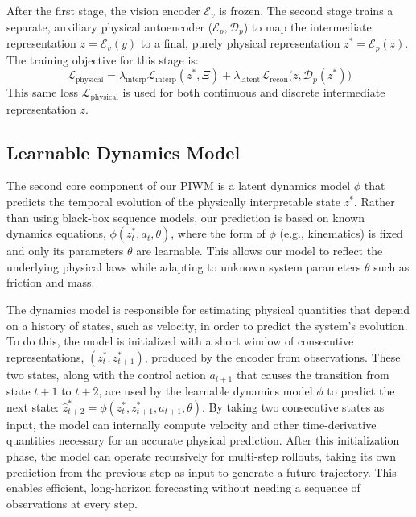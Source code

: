 \documentclass[sigconf]{acmart}
\begin{document}
After the first stage, the vision encoder \(\mathcal{E}_v\) is frozen. The second stage trains a separate, auxiliary {physical autoencoder} (\(\mathcal{E}_p, \mathcal{D}_p\)) to map the intermediate representation \(z = \mathcal{E}_v(y)\) to a final, purely physical representation \(z^* = \mathcal{E}_p(z)\). The training objective for this stage is:
\begin{equation}
    \mathcal{L}_{\text{physical}} = \lambda_{\text{interp}}\mathcal{L}_{\text{interp}}(z^*, \Xi) + \lambda_{\text{latent}}\mathcal{L}_{\text{recon}}\big(z,  \mathcal{D}_p(z^*))
\end{equation}
This same loss \(\mathcal{L}_{\text{physical}}\) is used for both continuous and discrete intermediate representation \(z\).




 
\subsection{Learnable Dynamics Model}


The second core component of our PIWM is a latent dynamics model \(\phi\) that predicts the temporal evolution of the physically interpretable state \(z^*\). Rather than using black-box sequence models, our prediction is based on known dynamics equations, \(\phi(z^*_t, a_t, \theta)\), where the form of \(\phi\) (e.g., kinematics) is fixed and only its parameters \(\theta\) are learnable. This allows our model to reflect the underlying physical laws while adapting to unknown system parameters $\theta$ such as friction and mass.

The dynamics model is responsible for estimating physical quantities that depend on a history of states, such as velocity, in order to predict the system's evolution. 
To do this, the model is initialized with a short window of consecutive representations, \( (z^*_t, z^*_{t+1}) \), produced by the encoder from observations. 
These two states, along with the control action \(a_{t+1}\) that causes the transition from state \(t+1\) to \(t+2\), are used by the learnable dynamics model \(\phi\) to predict the next state: \( \hat{z}^*_{t+2} = \phi(z^*_t, z^*_{t+1}, a_{t+1}, \theta) \). 
By taking two consecutive states as input, the model can internally compute velocity and other time-derivative quantities necessary for an accurate physical prediction. 
After this initialization phase, the model can operate recursively for multi-step rollouts, taking its own prediction from the previous step as input to generate a future trajectory. 
This enables efficient, long-horizon forecasting without needing a sequence of observations at every step.
\end{document}
